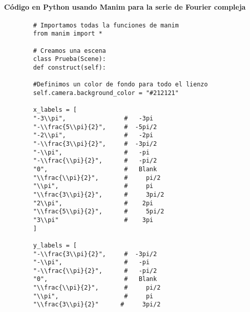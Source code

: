 \paragraph{Código en Python usando Manim para la serie de Fourier compleja} \label{app2:complex-code-python-manim}
\begin{longlisting}
	\begin{verbatim}
		# Importamos todas la funciones de manim
		from manim import *
		
		# Creamos una escena
		class Prueba(Scene):
		def construct(self):
		
		#Definimos un color de fondo para todo el lienzo
		self.camera.background_color = "#212121" 
		
		x_labels = [
		"-3\\pi",                #   -3pi
		"-\\frac{5\\pi}{2}",     #  -5pi/2
		"-2\\pi",                #   -2pi
		"-\\frac{3\\pi}{2}",     #  -3pi/2
		"-\\pi",                 #   -pi
		"-\\frac{\\pi}{2}",      #   -pi/2
		"0",                     #   Blank
		"\\frac{\\pi}{2}",       #     pi/2
		"\\pi",                  #     pi
		"\\frac{3\\pi}{2}",      #     3pi/2
		"2\\pi",                 #    2pi
		"\\frac{5\\pi}{2}",      #     5pi/2
		"3\\pi"                  #    3pi
		]
		
		y_labels = [
		"-\\frac{3\\pi}{2}",     #  -3pi/2
		"-\\pi",                 #   -pi
		"-\\frac{\\pi}{2}",      #   -pi/2
		"0",                     #   Blank
		"\\frac{\\pi}{2}",       #     pi/2
		"\\pi",                  #     pi
		"\\frac{3\\pi}{2}"      #     3pi/2
		

\end{verbatim}
\end{longlisting}
